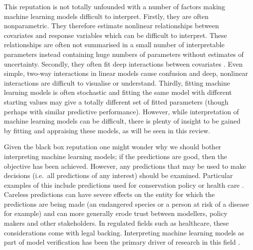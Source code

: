 \documentclass[10pt,]{article}
\begin{document}
This reputation is not totally unfounded with a number of factors making machine learning models difficult to interpret. Firstly, they are often nonparametric. They therefore estimate nonlinear relationships between covariates and response variables which can be difficult to interpret. These relationships are often not summarised in a small number of interpretable parameters instead containing huge numbers of parameters without estimates of uncertainty. Secondly, they often fit deep interactions between covariates \citep{lunetta2004screening}. Even simple, two-way interactions in linear models cause confusion \citep{engqvist2005mistreatment, lamina2012visualizing} and deep, nonlinear interactions are difficult to visualise or understand. Thirdly, fitting machine learning models is often stochastic \citep{breiman2001random, glorot2002understanding} and fitting the same model with different starting values may give a totally different set of fitted parameters (though perhaps with similar predictive performance). However, while interpretation of machine learning models can be difficult, there is plenty of insight to be gained by fitting and appraising these models, as will be seen in this review.

Given the black box reputation one might wonder why we should bother interpreting machine learning models; if the predictions are good, then the objective has been achieved. However, any predictions that may be used to make decisions (i.e.~all predictions of any interest) should be examined. Particular examples of this include predictions used for conservation policy or health care \citep{vayena2018machine}. Careless predictions can have severe effects on the entity for which the predictions are being made (an endangered species or a person at risk of a disease for example) and can more generally erode trust between modellers, policy makers and other stakeholders. In regulated fields such as healthcare, these considerations come with legal backing. Interpreting machine learning models as part of model verification has been the primary driver of research in this field \citep{molnar, ribeiro2016should}.
\end{document}
